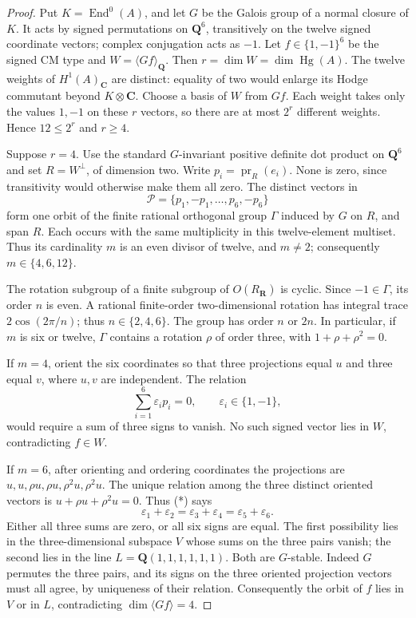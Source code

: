 \documentclass[11pt,reqno]{article}
\theoremstyle{emphasizedplain}
\theoremstyle{emphasizeddefinition}
\theoremstyle{emphasizeddefinition}
\DeclareMathOperator{\End}{End}
\DeclareMathOperator{\Hg}{Hg}
\newcommand{\Q}{\mathbf Q}
\newcommand{\C}{\mathbf C}
\newcommand{\R}{\mathbf R}
\begin{document}
\begin{proof}
Put $K=\End^0(A)$, and let $G$ be the Galois group of a normal closure
of $K$. It acts by signed permutations on $\Q^6$, transitively on
the twelve signed coordinate vectors; complex conjugation acts as $-1$.
Let $f\in\{1,-1\}^6$ be the signed CM type and
$W=\langle Gf\rangle_\Q$. Then $r=\dim W=\dim\Hg(A)$.
The twelve weights of $H^1(A)_\C$ are distinct: equality of two would
enlarge its Hodge commutant beyond $K\otimes\C$.
Choose a basis of $W$ from $Gf$. Each weight takes only the values
$1,-1$ on these $r$ vectors, so there are at most $2^r$ different
weights. Hence $12\le2^r$ and $r\ge4$.

Suppose $r=4$. Use the standard $G$-invariant positive definite dot
product on $\Q^6$ and set $R=W^\perp$, of dimension two. Write
$p_i=\operatorname{pr}_R(e_i)$. None is zero, since transitivity
would otherwise make them all zero. The distinct vectors in
\[
 \mathcal P=\{p_1,-p_1,\ldots,p_6,-p_6\}
\]
form one orbit of the finite rational orthogonal group $\Gamma$
induced by $G$ on $R$, and span $R$. Each occurs with the same
multiplicity in this twelve-element multiset. Thus its cardinality
$m$ is an even divisor of twelve, and $m\ne2$; consequently
$m\in\{4,6,12\}$.

The rotation subgroup of a finite subgroup of $O(R_\R)$ is cyclic.
Since $-1\in\Gamma$, its order $n$ is even. A rational finite-order
two-dimensional rotation has integral trace $2\cos(2\pi/n)$;
thus $n\in\{2,4,6\}$. The group has order $n$ or $2n$.
In particular, if $m$ is six or twelve, $\Gamma$ contains a rotation
$\rho$ of order three, with $1+\rho+\rho^2=0$.

If $m=4$, orient the six coordinates so that three projections equal
$u$ and three equal $v$, where $u,v$ are independent. The relation
\[
 \sum_{i=1}^6\varepsilon_i p_i=0,
 \qquad \varepsilon_i\in\{1,-1\},
 \tag{*}
\]
would require a sum of three signs to vanish. No such signed vector
lies in $W$, contradicting $f\in W$.

If $m=6$, after orienting and ordering coordinates the projections
are $u,u,\rho u,\rho u,\rho^2u,\rho^2u$.
The unique relation among the three distinct oriented vectors is
$u+\rho u+\rho^2u=0$. Thus (*) says
\[
 \varepsilon_1+\varepsilon_2
 =\varepsilon_3+\varepsilon_4
 =\varepsilon_5+\varepsilon_6.
\]
Either all three sums are zero, or all six signs are equal.
The first possibility lies in the three-dimensional subspace $V$
whose sums on the three pairs vanish; the second lies in the line
$L=\Q(1,1,1,1,1,1)$. Both are $G$-stable. Indeed $G$ permutes the
three pairs, and its signs on the three oriented projection vectors
must all agree, by uniqueness of their relation.
Consequently the orbit of $f$ lies in $V$ or in $L$, contradicting
$\dim\langle Gf\rangle=4$.


\end{proof}
\end{document}
